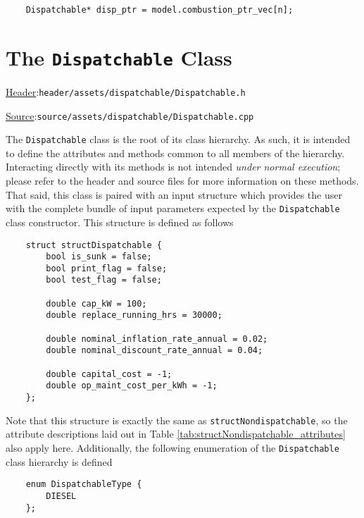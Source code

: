 \documentclass[12pt, letterpaper]{report}
\begin{document}
\begin{verbatim}
    Dispatchable* disp_ptr = model.combustion_ptr_vec[n];
\end{verbatim}

\section{The \texttt{Dispatchable} Class}

\begin{large}
\noindent\underline{Header}:\quad\texttt{header/assets/dispatchable/Dispatchable.h}\par
\noindent\underline{Source}:\quad\texttt{source/assets/dispatchable/Dispatchable.cpp}\par
\end{large}
\vspace{5mm}

The \texttt{Dispatchable} class is the root of its class hierarchy. As such, it is intended to define the attributes and methods common to all members of the hierarchy. Interacting directly with its methods is not intended \textit{under normal execution}; please refer to the header and source files for more information on these methods. That said, this class is paired with an input structure which provides the user with the complete bundle of input parameters expected by the \texttt{Dispatchable} class constructor. This structure is defined as follows

\begin{verbatim}
    struct structDispatchable {
        bool is_sunk = false;
        bool print_flag = false;
        bool test_flag = false;
        
        double cap_kW = 100;
        double replace_running_hrs = 30000;
        
        double nominal_inflation_rate_annual = 0.02;
        double nominal_discount_rate_annual = 0.04;
        
        double capital_cost = -1;
        double op_maint_cost_per_kWh = -1;
    };
\end{verbatim}

\noindent Note that this structure is exactly the same as \texttt{structNondispatchable}, so the attribute descriptions laid out in Table \ref{tab:structNondispatchable_attributes} also apply here. Additionally, the following enumeration of the \texttt{Dispatchable} class hierarchy is defined

\begin{verbatim}
    enum DispatchableType {
        DIESEL
    };
\end{verbatim}
\end{document}
